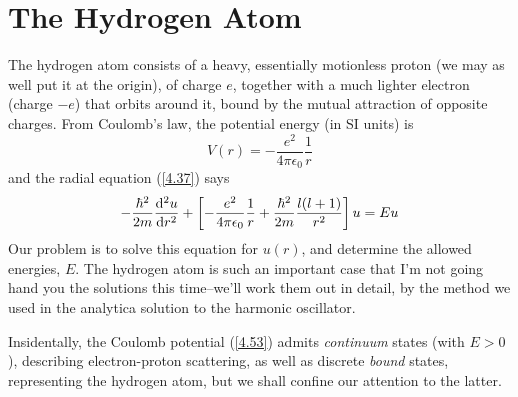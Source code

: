 \section{The Hydrogen Atom}
The hydrogen atom consists of a heavy, essentially motionless proton (we may as well put it at the origin), of charge $e$, together with a much lighter electron (charge $-e$) that orbits around it, bound by the mutual attraction of opposite charges. From Coulomb's law, the potential energy (in SI units) is
\begin{equation}\label{4.52}
	V(r)=-\frac{e^2}{4\pi\epsilon_0}\frac{1}{r}
\end{equation}
and the radial equation (\ref{4.37}) says
\begin{equation}\label{4.53}
	-\frac{\hbar^2}{2m}\dv[2]{u}{r}+\left[-\frac{e^2}{4\pi\epsilon_0}\frac{1}{r}+\frac{\hbar^2}{2m}\frac{l(l+1)}{r^2}\right]u=Eu
\end{equation}
Our problem is to solve this equation for $u(r)$, and determine the allowed energies, $E$. The hydrogen atom is such an important case that I'm not going hand you the solutions this time--we'll work them out in detail, by the method we used in the analytica solution to the harmonic oscillator. 

Insidentally, the Coulomb potential (\ref{4.53}) admits \textit{continuum} states (with $E>0$), describing electron-proton scattering, as well as discrete \textit{bound} states, representing the hydrogen atom, but we shall confine our attention to the latter.

